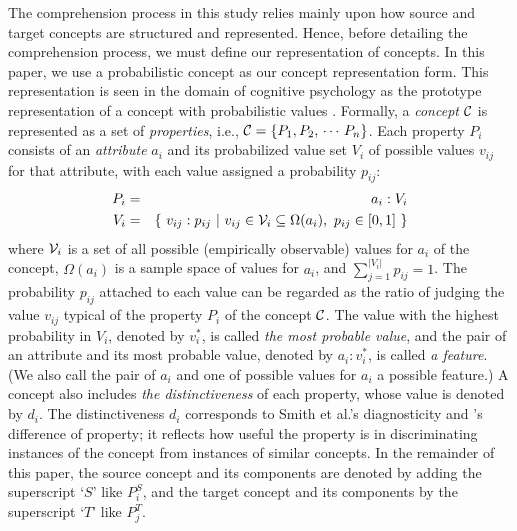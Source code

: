 The comprehension process in this study relies mainly upon how source and
target concepts are structured and represented.
Hence, before detailing the comprehension process, we must define our
representation of concepts.
In this paper, we use a probabilistic concept as our concept
representation form. This representation is seen in the domain of
cognitive psychology as the prototype representation of a concept
\cite{Rosch75} with probabilistic values \cite{Smith88,Iwayama90}.
Formally, a {\it concept\/} $\cal C$ is represented as a set of {\it properties},
i.e., ${\cal C}=\{P_1,P_2,\,\cdots\,P_n\}$.
Each property $P_{i}$ consists of an {\it attribute} $a_i$ and its probabilized value 
set $V_i$ of possible values $v_{ij}$ for that attribute, 
with each value assigned a probability $p_{ij}$:
\begin{eqnarray*}
 P_i & = & a_i:V_i \\
 V_i & = & \{ ~v_{ij}:p_{ij}~|~v_{ij} \in {\cal V}_{i} \subseteq \Omega(a_i),~p_{ij} \in [0,1]~ \}
\end{eqnarray*}
where ${\cal V}_{i}$ is a set of all possible (empirically observable) values 
for $a_i$ of the concept, $\Omega(a_i)$ is a sample space of values for $a_i$, 
and $\sum_{j=1}^{|V_i|} p_{ij} = 1$.
The probability $p_{ij}$ attached to each value can be regarded as 
the ratio of judging the value $v_{ij}$ typical of the property $P_i$ 
of the concept ${\cal C}$. 
The value with the highest probability in $V_i$, denoted by $v^{*}_i$, 
is called {\it the most probable value}, and the pair of an
attribute and its most probable value, denoted by $a_i:v^{*}_i$, 
is called {\it a feature}.
(We also call the pair of $a_i$ and one of possible values for $a_i$ a possible feature.)
A concept also includes {\it the distinctiveness\/} of each property,
whose value is denoted by $d_i$. 
The distinctiveness $d_i$ corresponds to Smith et al.'s\citeyear{Smith88} diagnosticity 
and \citeauthor{Iwayama90}'s\citeyear{Iwayama90} difference of property; 
it reflects how useful the property is in discriminating instances of 
the concept from instances of similar concepts.
In the remainder of this paper, the source concept and its components
are denoted by adding the superscript `$S$' like $P^S_i$, and
the target concept and its components by the superscript `$T$' like $P^T_j$.

